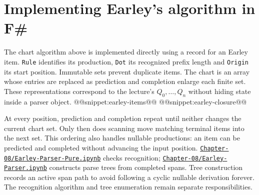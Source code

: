 \section{Implementing Earley's algorithm in F\#}
The chart algorithm above is implemented directly using a record for an Earley item.
\texttt{Rule} identifies its production, \texttt{Dot} its recognized prefix length and \texttt{Origin} its start position.
Immutable sets prevent duplicate items.
The chart is an array whose entries are replaced as prediction and completion enlarge each finite set.
These representations correspond to the lecture's $Q_0,\ldots,Q_n$ without hiding state inside a parser object.
@@snippet:earley-items@@
@@snippet:earley-closure@@

At every position, prediction and completion repeat until neither changes the current chart set.
Only then does scanning move matching terminal items into the next set.
This ordering also handles nullable productions: an item can be predicted and completed without advancing the input position.
\href{../../Chapter-08/Earley-Parser-Pure.ipynb}{\nolinkurl{Chapter-08/Earley-Parser-Pure.ipynb}} checks recognition; \href{../../Chapter-08/Earley-Parser.ipynb}{\nolinkurl{Chapter-08/Earley-Parser.ipynb}} constructs parse trees from completed spans.
Tree construction records an active span path to avoid following a cyclic nullable derivation forever.
The recognition algorithm and tree enumeration remain separate responsibilities.
